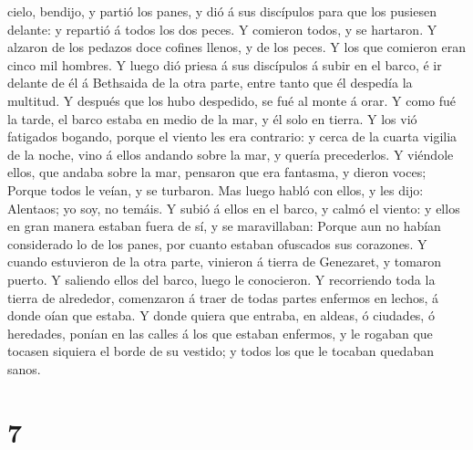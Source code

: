 cielo, bendijo, y partió los panes, y dió á sus discípulos para que los
pusiesen delante: y repartió á todos los dos peces.  Y
comieron todos, y se hartaron.  Y alzaron de los pedazos
doce cofines llenos, y de los peces.  Y los que comieron
eran cinco mil hombres.  Y luego dió priesa á sus
discípulos á subir en el barco, é ir delante de él á Bethsaida de la
otra parte, entre tanto que él despedía la multitud.  Y
después que los hubo despedido, se fué al monte á orar. 
Y como fué la tarde, el barco estaba en medio de la mar, y él solo en
tierra.  Y los vió fatigados bogando, porque el viento
les era contrario: y cerca de la cuarta vigilia de la noche, vino á
ellos andando sobre la mar, y quería precederlos.  Y
viéndole ellos, que andaba sobre la mar, pensaron que era fantasma, y
dieron voces;  Porque todos le veían, y se turbaron. Mas
luego habló con ellos, y les dijo: Alentaos; yo soy, no temáis.
 Y subió á ellos en el barco, y calmó el viento: y ellos
en gran manera estaban fuera de sí, y se maravillaban: 
Porque aun no habían considerado lo de los panes, por cuanto estaban
ofuscados sus corazones.  Y cuando estuvieron de la otra
parte, vinieron á tierra de Genezaret, y tomaron puerto. 
Y saliendo ellos del barco, luego le conocieron.  Y
recorriendo toda la tierra de alrededor, comenzaron á traer de todas
partes enfermos en lechos, á donde oían que estaba.  Y
donde quiera que entraba, en aldeas, ó ciudades, ó heredades, ponían en
las calles á los que estaban enfermos, y le rogaban que tocasen siquiera
el borde de su vestido; y todos los que le tocaban quedaban sanos.

\hypertarget{section-6}{%
\section{7}\label{section-6}}

